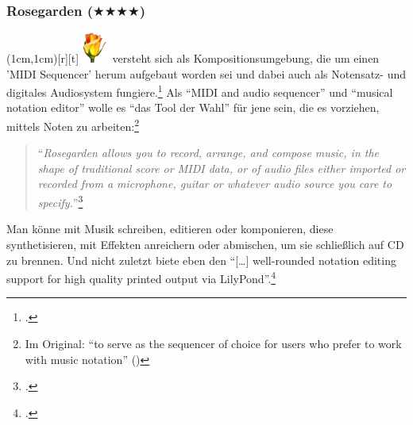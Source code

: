 %
%


\subsubsection{Rosegarden ($\bigstar\bigstar\bigstar\bigstar$)}

\parpic(1cm,1cm)[r][t]{\includegraphics[width=1cm]{logos/rosegarden-300dpi.png}}
\label{Rosegarden} versteht sich als Kompositionsumgebung, die
um einen 'MIDI Sequencer' herum aufgebaut worden sei und dabei auch als
Notensatz- und digitales Audiosystem fungiere.\footcite[vgl.][\nopage
wp]{Rosegarden2019a} Als \enquote{MIDI and audio sequencer} und \enquote{musical
notation editor} wolle es \enquote{das Tool der Wahl} für jene sein, die es
vorziehen, mittels Noten zu arbeiten:\footnote{Im Original: \enquote{to serve as
the sequencer of choice for users who prefer to work with music notation}
(\cite[vgl.][\nopage wp]{Rosegarden2019c})}

\begin{quote}\enquote{\textit{Rosegarden allows you to record, arrange, and compose
music, in the shape of traditional score or MIDI data, or of audio files either
imported or recorded from a microphone, guitar or whatever audio source you care
to specify.}}\footcite[vgl.][\nopage wp]{Rosegarden2019c} \end{quote}

Man könne mit  Musik schreiben, editieren oder komponieren,
diese synthetisieren, mit Effekten anreichern oder abmischen, um sie schließlich
auf CD zu brennen. Und nicht zuletzt biete  eben den
\enquote{[\ldots] well-rounded notation editing support for high quality printed
output via LilyPond}.\footcite[vgl.][\nopage wp]{Rosegarden2019c}

